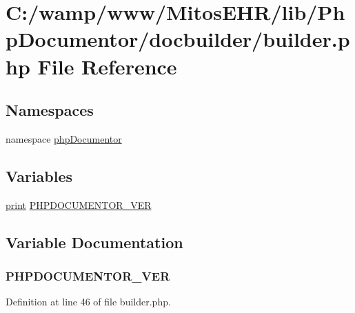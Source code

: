 \hypertarget{builder_8php}{\section{\-C\-:/wamp/www/\-Mitos\-E\-H\-R/lib/\-Php\-Documentor/docbuilder/builder.php \-File \-Reference}
\label{builder_8php}
}
\subsection*{\-Namespaces}
\begin{DoxyCompactItemize}
\item 
namespace \hyperlink{namespacephp_documentor}{php\-Documentor}
\end{DoxyCompactItemize}
\subsection*{\-Variables}
\begin{DoxyCompactItemize}
\item 
\hyperlink{tokenizer__test_8php_a3ad3a4240c0f97c7e85aff5c52a454d4}{print} \hyperlink{builder_8php_a81d37434d16bfdfff23e418fa4f0e37e}{\-P\-H\-P\-D\-O\-C\-U\-M\-E\-N\-T\-O\-R\-\_\-\-V\-E\-R}
\end{DoxyCompactItemize}


\subsection{\-Variable \-Documentation}
\hypertarget{builder_8php_a81d37434d16bfdfff23e418fa4f0e37e}{
\subsubsection[{\-P\-H\-P\-D\-O\-C\-U\-M\-E\-N\-T\-O\-R\-\_\-\-V\-E\-R}]{ {\bf \-P\-H\-P\-D\-O\-C\-U\-M\-E\-N\-T\-O\-R\-\_\-\-V\-E\-R}}}\label{builder_8php_a81d37434d16bfdfff23e418fa4f0e37e}


\-Definition at line 46 of file builder.\-php.

